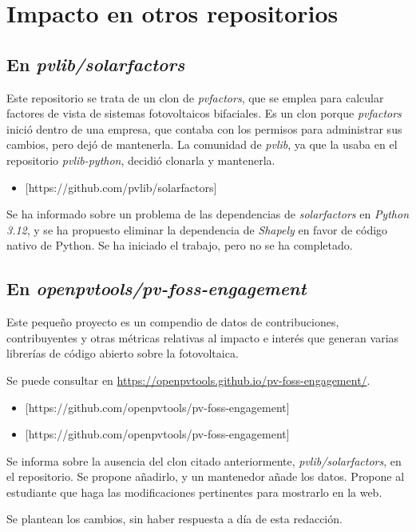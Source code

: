 
\section{Impacto en otros repositorios}

\subsection{En \textit{pvlib/solarfactors}}

Este repositorio se trata de un clon de \textit{pvfactors}, que se emplea para calcular factores de vista de sistemas fotovoltaicos bifaciales. Es un clon porque \textit{pvfactors} inició dentro de una empresa, que contaba con los permisos para administrar sus cambios, pero dejó de mantenerla. La comunidad de \textit{pvlib}, ya que la usaba en el repositorio \textit{pvlib-python}, decidió clonarla y mantenerla.

\begin{itemize}
    \item {}[https://github.com/pvlib/solarfactors]
\end{itemize}

Se ha informado sobre un problema de las dependencias de \textit{solarfactors} en \textit{Python 3.12}, y se ha propuesto eliminar la dependencia de \textit{Shapely} en favor de código nativo de Python. Se ha iniciado el trabajo, pero no se ha completado.

\subsection{En \textit{openpvtools/pv-foss-engagement}}

Este pequeño proyecto es un compendio de datos de contribuciones, contribuyentes y otras métricas relativas al impacto e interés que generan varias librerías de código abierto sobre la fotovoltaica.

Se puede consultar en \url{https://openpvtools.github.io/pv-foss-engagement/}.

\begin{itemize}
    \item {}[https://github.com/openpvtools/pv-foss-engagement]
    \item {}[https://github.com/openpvtools/pv-foss-engagement]
\end{itemize}

Se informa sobre la ausencia del clon citado anteriormente, \textit{pvlib/solarfactors}, en el repositorio. Se propone añadirlo, y un mantenedor añade los datos. Propone al estudiante que haga las modificaciones pertinentes para mostrarlo en la web.

Se plantean los cambios, sin haber respuesta a día de esta redacción.

